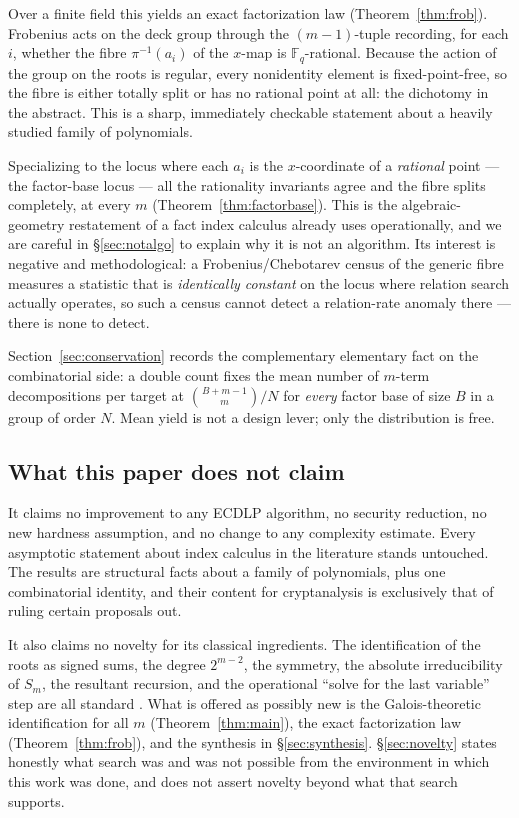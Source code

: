 \documentclass[11pt,a4paper]{article}
\theoremstyle{plain}
\theoremstyle{definition}
\newcommand{\FF}{\mathbb{F}}
\newcommand{\Fq}{\FF_q}
\begin{document}
Over a finite field this yields an exact factorization law
(Theorem~\ref{thm:frob}). Frobenius acts on the deck group through the
$(m-1)$-tuple recording, for each $i$, whether the fibre $\pi^{-1}(a_i)$ of the
$x$-map is $\Fq$-rational. Because the action of the group on the roots is
regular, every nonidentity element is fixed-point-free, so the fibre is either
totally split or has no rational point at all: the dichotomy in the abstract.
This is a sharp, immediately checkable statement about a heavily studied family
of polynomials.

Specializing to the locus where each $a_i$ is the $x$-coordinate of a
\emph{rational} point --- the factor-base locus --- all the rationality invariants
agree and the fibre splits completely, at every $m$
(Theorem~\ref{thm:factorbase}). This is the algebraic-geometry restatement of a
fact index calculus already uses operationally, and we are careful in
\S\ref{sec:notalgo} to explain why it is not an algorithm. Its interest is
negative and methodological: a Frobenius/Chebotarev census of the generic fibre
measures a statistic that is \emph{identically constant} on the locus where
relation search actually operates, so such a census cannot detect a
relation-rate anomaly there --- there is none to detect.

Section~\ref{sec:conservation} records the complementary elementary fact on the
combinatorial side: a double count fixes the mean number of $m$-term
decompositions per target at $\binom{B+m-1}{m}/N$ for \emph{every} factor base of
size $B$ in a group of order $N$. Mean yield is not a design lever; only the
distribution is free.

\subsection*{What this paper does not claim}

It claims no improvement to any ECDLP algorithm, no security reduction, no new
hardness assumption, and no change to any complexity estimate. Every asymptotic
statement about index calculus in the literature stands untouched. The results
are structural facts about a family of polynomials, plus one combinatorial
identity, and their content for cryptanalysis is exclusively that of ruling
certain proposals out.

It also claims no novelty for its classical ingredients. The identification of
the roots as signed sums, the degree $2^{m-2}$, the symmetry, the absolute
irreducibility of $S_m$, the resultant recursion, and the operational
``solve for the last variable'' step are all standard
\cite{semaev2004,gaudry2009,ky2015}. What is offered as possibly new is the
Galois-theoretic identification for all $m$ (Theorem~\ref{thm:main}), the exact
factorization law (Theorem~\ref{thm:frob}), and the synthesis in
\S\ref{sec:synthesis}. \S\ref{sec:novelty} states honestly what search was and
was not possible from the environment in which this work was done, and does not
assert novelty beyond what that search supports.
\end{document}
